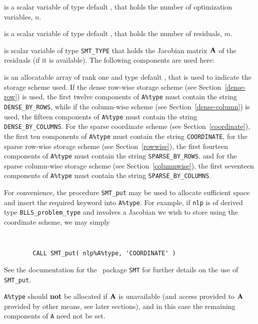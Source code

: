 \documentclass{galahad}
\newcommand{\packagename}{BLLS}
\begin{document}
\begin{description}

 is a scalar variable of type default \integer,
 that holds the number of optimization variables, $n$.

 is a scalar variable of type default \integer,
 that holds the number of residuals, $m$.

 is scalar variable of type {\tt SMT\_TYPE}
that holds the Jacobian matrix ${\mathbf{A}}$ of the residuals (if it is available).
The following components are used here:

\begin{description}

 is an allocatable array of rank one and type default
\character, that
is used to indicate the storage scheme used. If the dense row-wise
storage scheme (see Section~\ref{dense-row}) is used,
the first twelve components of {\tt A\%type} must contain the
string {\tt DENSE\_BY\_ROWS}, while if the column-wise scheme
(see Section~\ref{dense-column}) is used,
the fifteen components of {\tt A\%type} must contain the
string {\tt DENSE\_BY\_COLUMNS}.
For the sparse coordinate scheme (see Section~\ref{coordinate}),
the first ten components of {\tt A\%type} must contain the
string {\tt COORDINATE},
for the sparse row-wise storage scheme (see Section~\ref{rowwise}),
the first fourteen components of {\tt A\%type} must contain the
string {\tt SPARSE\_BY\_ROWS}.
and for the sparse column-wise storage scheme (see Section~\ref{columnwise}),
the first seventeen components of {\tt A\%type} must contain the
string {\tt SPARSE\_BY\_COLUMNS}.

For convenience, the procedure {\tt SMT\_put}
may be used to allocate sufficient space and insert the required keyword
into {\tt A\%type}.
For example, if {\tt nlp} is of derived type {\tt \packagename\_problem\_type}
and involves a Jacobian we wish to store using the coordinate scheme,
we may simply
{\tt
\begin{verbatim}
        CALL SMT_put( nlp%A%type, 'COORDINATE' )
\end{verbatim}
}
\noindent
See the documentation for the \galahad\ package {\tt SMT}
for further details on the use of {\tt SMT\_put}.

\noindent
{\tt A\%type} should {\bf not} be allocated if ${\mathbf{A}}$ is unavailable
(and access provided to  ${\mathbf{A}}$ provided by other means, see later sections),
and in this case the remaining components of {\tt A} need not be set.


\end{description}
\end{description}
\end{document}
